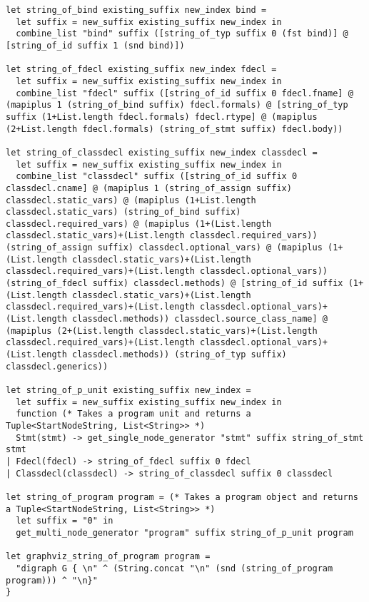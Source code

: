 \documentclass{article}
\begin{document}
\begin{verbatim}
let string_of_bind existing_suffix new_index bind =
  let suffix = new_suffix existing_suffix new_index in
  combine_list "bind" suffix ([string_of_typ suffix 0 (fst bind)] @ [string_of_id suffix 1 (snd bind)])

let string_of_fdecl existing_suffix new_index fdecl =
  let suffix = new_suffix existing_suffix new_index in
  combine_list "fdecl" suffix ([string_of_id suffix 0 fdecl.fname] @ (mapiplus 1 (string_of_bind suffix) fdecl.formals) @ [string_of_typ suffix (1+List.length fdecl.formals) fdecl.rtype] @ (mapiplus (2+List.length fdecl.formals) (string_of_stmt suffix) fdecl.body))

let string_of_classdecl existing_suffix new_index classdecl =
  let suffix = new_suffix existing_suffix new_index in
  combine_list "classdecl" suffix ([string_of_id suffix 0 classdecl.cname] @ (mapiplus 1 (string_of_assign suffix) classdecl.static_vars) @ (mapiplus (1+List.length classdecl.static_vars) (string_of_bind suffix) classdecl.required_vars) @ (mapiplus (1+(List.length classdecl.static_vars)+(List.length classdecl.required_vars)) (string_of_assign suffix) classdecl.optional_vars) @ (mapiplus (1+(List.length classdecl.static_vars)+(List.length classdecl.required_vars)+(List.length classdecl.optional_vars)) (string_of_fdecl suffix) classdecl.methods) @ [string_of_id suffix (1+(List.length classdecl.static_vars)+(List.length classdecl.required_vars)+(List.length classdecl.optional_vars)+(List.length classdecl.methods)) classdecl.source_class_name] @ (mapiplus (2+(List.length classdecl.static_vars)+(List.length classdecl.required_vars)+(List.length classdecl.optional_vars)+(List.length classdecl.methods)) (string_of_typ suffix) classdecl.generics))

let string_of_p_unit existing_suffix new_index =
  let suffix = new_suffix existing_suffix new_index in
  function (* Takes a program unit and returns a Tuple<StartNodeString, List<String>> *)
  Stmt(stmt) -> get_single_node_generator "stmt" suffix string_of_stmt stmt
| Fdecl(fdecl) -> string_of_fdecl suffix 0 fdecl
| Classdecl(classdecl) -> string_of_classdecl suffix 0 classdecl

let string_of_program program = (* Takes a program object and returns a Tuple<StartNodeString, List<String>> *)
  let suffix = "0" in
  get_multi_node_generator "program" suffix string_of_p_unit program

let graphviz_string_of_program program =
  "digraph G { \n" ^ (String.concat "\n" (snd (string_of_program program))) ^ "\n}"
}\end{verbatim}
\end{document}
